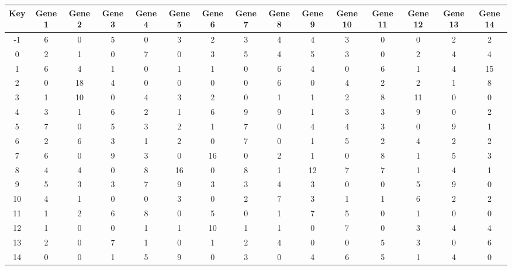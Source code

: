 \begin{tabular}{|c|c|c|c|c|c|c|c|c|c|c|c|c|c|c|}
\hline
Key & Gene 1 & Gene 2 & Gene 3 & Gene 4 & Gene 5 & Gene 6 & Gene 7 & Gene 8 & Gene 9 & Gene 10 & Gene 11 & Gene 12 & Gene 13 & Gene 14 \\
\hline
-1 & 6 & 0 & 5 & 0 & 3 & 2 & 3 & 4 & 4 & 3 & 0 & 0 & 2 & 2 \\
0 & 2 & 1 & 0 & 7 & 0 & 3 & 5 & 4 & 5 & 3 & 0 & 2 & 4 & 4 \\
1 & 6 & 4 & 1 & 0 & 1 & 1 & 0 & 6 & 4 & 0 & 6 & 1 & 4 & 15 \\
2 & 0 & 18 & 4 & 0 & 0 & 0 & 0 & 6 & 0 & 4 & 2 & 2 & 1 & 8 \\
3 & 1 & 10 & 0 & 4 & 3 & 2 & 0 & 1 & 1 & 2 & 8 & 11 & 0 & 0 \\
4 & 3 & 1 & 6 & 2 & 1 & 6 & 9 & 9 & 1 & 3 & 3 & 9 & 0 & 2 \\
5 & 7 & 0 & 5 & 3 & 2 & 1 & 7 & 0 & 4 & 4 & 3 & 0 & 9 & 1 \\
6 & 2 & 6 & 3 & 1 & 2 & 0 & 7 & 0 & 1 & 5 & 2 & 4 & 2 & 2 \\
7 & 6 & 0 & 9 & 3 & 0 & 16 & 0 & 2 & 1 & 0 & 8 & 1 & 5 & 3 \\
8 & 4 & 4 & 0 & 8 & 16 & 0 & 8 & 1 & 12 & 7 & 7 & 1 & 4 & 1 \\
9 & 5 & 3 & 3 & 7 & 9 & 3 & 3 & 4 & 3 & 0 & 0 & 5 & 9 & 0 \\
10 & 4 & 1 & 0 & 0 & 3 & 0 & 2 & 7 & 3 & 1 & 1 & 6 & 2 & 2 \\
11 & 1 & 2 & 6 & 8 & 0 & 5 & 0 & 1 & 7 & 5 & 0 & 1 & 0 & 0 \\
12 & 1 & 0 & 0 & 1 & 1 & 10 & 1 & 1 & 0 & 7 & 0 & 3 & 4 & 4 \\
13 & 2 & 0 & 7 & 1 & 0 & 1 & 2 & 4 & 0 & 0 & 5 & 3 & 0 & 6 \\
14 & 0 & 0 & 1 & 5 & 9 & 0 & 3 & 0 & 4 & 6 & 5 & 1 & 4 & 0 \\
\hline
\end{tabular}